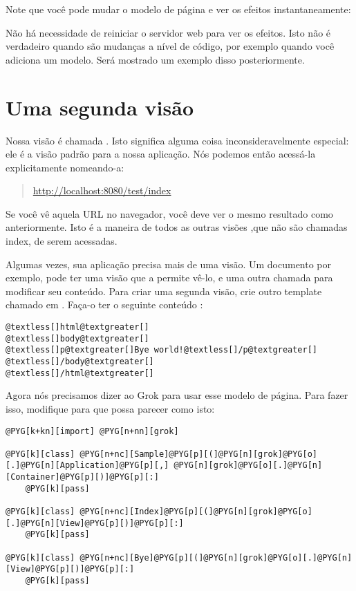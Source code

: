 \documentclass[a4paper,12pt,portuguese]{manual}
\begin{document}
Note que você pode mudar o modelo de página e ver os efeitos
instantaneamente:

Não há necessidade de reiniciar o servidor web para ver os efeitos.
Isto não é verdadeiro quando são mudanças a nível de código, por
exemplo quando você adiciona um modelo. Será mostrado um exemplo disso
posteriormente.


\section{Uma segunda visão}

Nossa visão é chamada . Isto significa alguma
coisa inconsideravelmente especial: ele é a visão padrão para a
nossa aplicação. Nós podemos então acessá-la explicitamente
nomeando-a:
\begin{quote}

\href{http://localhost:8080/test/index}{http://localhost:8080/test/index}
\end{quote}

Se você vê aquela URL no navegador, você deve ver o mesmo resultado
como anteriormente. Isto é a maneira de todos as outras visões
,que não são chamadas index, de serem acessadas.

Algumas vezes, sua aplicação precisa mais de uma visão. Um
documento por exemplo, pode ter uma visão que a permite vê-lo,
e uma outra chamada  para modificar seu conteúdo. Para criar
uma segunda visão, crie outro template chamado  em
. Faça-o ter o seguinte conteúdo :

\begin{Verbatim}[commandchars=@\[\]]
@textless[]html@textgreater[]
@textless[]body@textgreater[]
@textless[]p@textgreater[]Bye world!@textless[]/p@textgreater[]
@textless[]/body@textgreater[]
@textless[]/html@textgreater[]
\end{Verbatim}

Agora nós precisamos dizer ao Grok para usar esse modelo de página. Para fazer
isso, modifique  para que possa parecer como
isto:

\begin{Verbatim}[commandchars=@\[\]]
@PYG[k+kn][import] @PYG[n+nn][grok]
  
@PYG[k][class] @PYG[n+nc][Sample]@PYG[p][(]@PYG[n][grok]@PYG[o][.]@PYG[n][Application]@PYG[p][,] @PYG[n][grok]@PYG[o][.]@PYG[n][Container]@PYG[p][)]@PYG[p][:]
    @PYG[k][pass]

@PYG[k][class] @PYG[n+nc][Index]@PYG[p][(]@PYG[n][grok]@PYG[o][.]@PYG[n][View]@PYG[p][)]@PYG[p][:]
    @PYG[k][pass]

@PYG[k][class] @PYG[n+nc][Bye]@PYG[p][(]@PYG[n][grok]@PYG[o][.]@PYG[n][View]@PYG[p][)]@PYG[p][:]
    @PYG[k][pass]
\end{Verbatim}
\end{document}
